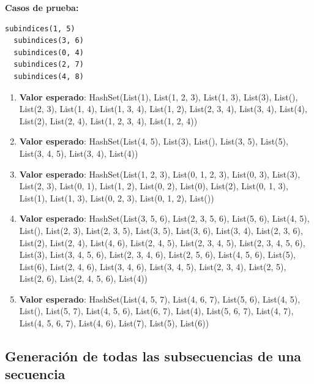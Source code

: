 \documentclass[12pt, a4paper]{article}
\begin{document}
  \textbf{Casos de prueba: \\}
\begin{lstlisting}[caption=Casos de prueba para la función subindices, label=lst:scala_code]
  subindices(1, 5)
  subindices(3, 6)
  subindices(0, 4)
  subindices(2, 7)
  subindices(4, 8)
\end{lstlisting}
\begin{enumerate}
  \item \textbf{Valor esperado}: HashSet(List(1), List(1, 2, 3), List(1, 3), List(3), List(), List(2, 3), List(1, 4), List(1, 3, 4), List(1, 2), List(2, 3, 4), List(3, 4), List(4), List(2), List(2, 4), List(1, 2, 3, 4), List(1, 2, 4))
  \item \textbf{Valor esperado}: HashSet(List(4, 5), List(3), List(), List(3, 5), List(5), List(3, 4, 5), List(3, 4), List(4))
  \item \textbf{Valor esperado}: HashSet(List(1, 2, 3), List(0, 1, 2, 3), List(0, 3), List(3), List(2, 3), List(0, 1), List(1, 2), List(0, 2), List(0), List(2), List(0, 1, 3), List(1), List(1, 3), List(0, 2, 3), List(0, 1, 2), List())
  \item \textbf{Valor esperado}: HashSet(List(3, 5, 6), List(2, 3, 5, 6), List(5, 6), List(4, 5), List(), List(2, 3), List(2, 3, 5), List(3, 5), List(3, 6), List(3, 4), List(2, 3, 6), List(2), List(2, 4), List(4, 6), List(2, 4, 5), List(2, 3, 4, 5), List(2, 3, 4, 5, 6), List(3), List(3, 4, 5, 6), List(2, 3, 4, 6), List(2, 5, 6), List(4, 5, 6), List(5), List(6), List(2, 4, 6), List(3, 4, 6), List(3, 4, 5), List(2, 3, 4), List(2, 5), List(2, 6), List(2, 4, 5, 6), List(4))
  \item \textbf{Valor esperado}: HashSet(List(4, 5, 7), List(4, 6, 7), List(5, 6), List(4, 5), List(), List(5, 7), List(4, 5, 6), List(6, 7), List(4), List(5, 6, 7), List(4, 7), List(4, 5, 6, 7), List(4, 6), List(7), List(5), List(6))
\end{enumerate}

\subsection{Generación de todas las subsecuencias de una secuencia}
\end{document}
